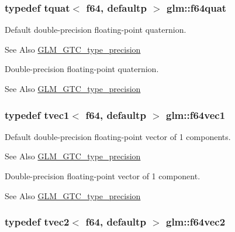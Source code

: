 \hypertarget{group__gtc__type__precision_ga5b54d7b36fbee5e271f73e6ed74e7172}{
\subsubsection[{f64quat}]{\setlength{\rightskip}{0pt plus 5cm}typedef tquat$<$ f64, defaultp $>$ {\bf glm\-::f64quat}}}\label{group__gtc__type__precision_ga5b54d7b36fbee5e271f73e6ed74e7172}
Default double-\/precision floating-\/point quaternion. \begin{DoxySeeAlso}{See Also}
\hyperlink{group__gtc__type__precision}{G\-L\-M\-\_\-\-G\-T\-C\-\_\-type\-\_\-precision}
\end{DoxySeeAlso}
Double-\/precision floating-\/point quaternion. \begin{DoxySeeAlso}{See Also}
\hyperlink{group__gtc__type__precision}{G\-L\-M\-\_\-\-G\-T\-C\-\_\-type\-\_\-precision} 
\end{DoxySeeAlso}
\hypertarget{group__gtc__type__precision_ga4c945cd13adbebd25ea3df003efb92ef}{
\subsubsection[{f64vec1}]{\setlength{\rightskip}{0pt plus 5cm}typedef tvec1$<$ f64, defaultp $>$ {\bf glm\-::f64vec1}}}\label{group__gtc__type__precision_ga4c945cd13adbebd25ea3df003efb92ef}
Default double-\/precision floating-\/point vector of 1 components. \begin{DoxySeeAlso}{See Also}
\hyperlink{group__gtc__type__precision}{G\-L\-M\-\_\-\-G\-T\-C\-\_\-type\-\_\-precision}
\end{DoxySeeAlso}
Double-\/precision floating-\/point vector of 1 component. \begin{DoxySeeAlso}{See Also}
\hyperlink{group__gtc__type__precision}{G\-L\-M\-\_\-\-G\-T\-C\-\_\-type\-\_\-precision} 
\end{DoxySeeAlso}
\hypertarget{group__gtc__type__precision_gacde4fe7b129521888cd30672c34650c5}{
\subsubsection[{f64vec2}]{\setlength{\rightskip}{0pt plus 5cm}typedef tvec2$<$ f64, defaultp $>$ {\bf glm\-::f64vec2}}}\label{group__gtc__type__precision_gacde4fe7b129521888cd30672c34650c5}
